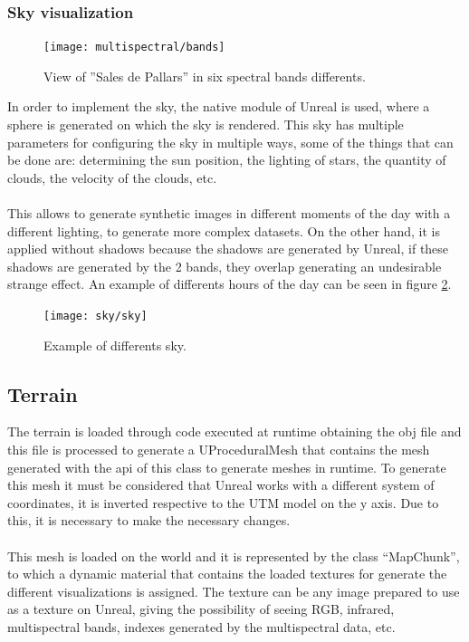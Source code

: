 \documentclass[10pt,a4paper,twocolumn,twoside]{article}
\begin{document}
\subsubsection{Sky visualization}

\begin{figure}[!h]
\centering
  	\texttt{[image: multispectral/bands]}
	\caption{View of ''Sales de Pallars'' in six spectral bands differents.}
	\label{fig-bands}
\end{figure}

In order to implement the sky, the native module of Unreal is used, where a sphere is generated on which the sky is rendered. This sky has multiple parameters for configuring the sky in multiple ways, some of the things that can be done are: determining the sun position, the lighting of stars, the quantity of clouds, the velocity of the clouds, etc.
\\\\
This allows to generate synthetic images in different moments of the day with a different lighting, to generate more complex datasets. On the other hand, it is applied without shadows because the shadows are generated by Unreal, if these shadows are generated by the 2 bands, they overlap generating an undesirable strange effect. An example of differents hours of the day can be seen in figure \ref{fig-sky}.

\begin{figure}[!h]
\centering
  	\texttt{[image: sky/sky]}
	\caption{Example of differents sky.}
	\label{fig-sky}
\end{figure}

\subsection{Terrain}
The terrain is loaded through code executed at runtime obtaining the obj file and this file is processed to generate a UProceduralMesh \cite{uprocedural} that contains the mesh generated with the api of this class to generate meshes in runtime. To generate this mesh it must be considered that Unreal works with a different system of coordinates, it is inverted respective to the UTM model on the y axis. Due to this, it is necessary to make the necessary changes.
\\
\\
This mesh is loaded on the world and it is represented by the class ``MapChunk'', to which a dynamic material that contains the loaded textures for generate the different visualizations is assigned. The texture can be any image prepared to use as a texture on Unreal, giving the possibility of seeing RGB, infrared, multispectral bands, indexes generated by the multispectral data, etc.
\end{document}
